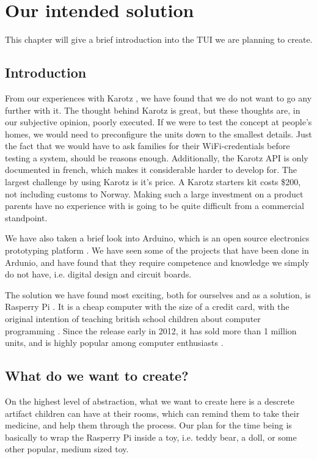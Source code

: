 
\chapter{Our intended solution}
\label{chp:our-solution}

This chapter will give a brief introduction into the TUI we are planning to create. 

\section{Introduction}
From our experiences with Karotz \cite{karotz}, we have found that we do not want to go any further with it. The thought behind Karotz is great, but these thoughts are, in our subjective opinion, poorly executed. If we were to test the concept at people's homes, we would need to preconfigure the units down to the smallest details. Just the fact that we would have to ask families for their WiFi-credentials before testing a system, should be reasons enough.
Additionally, the Karotz API is only documented in french, which makes it considerable harder to develop for. The largest challenge by using Karotz is it's price. A Karotz starters kit costs \$200, not including customs to Norway. Making such a large investment on a product parents have no experience with is going to be quite difficult from a commercial standpoint.  


We have also taken a brief look into Arduino, which is an open source electronics prototyping platform \cite{arduino}. We have seen some of the projects that have been done in Ardunio, and have found that they require competence and knowledge we simply do not have, i.e. digital design and circuit boards. 


The solution we have found most exciting, both for ourselves and as a solution, is Rasperry Pi \cite{rasperrypi}. It is a cheap computer with the size of a credit card, with the original intention of teaching british school children about computer programming \cite{rasperrypi-about}. Since the release early in 2012, it has sold more than 1 million units, and is highly popular among computer enthusiasts \cite{pimillion}. 


\section{What do we want to create?}
On the highest level of abstraction, what we want to create here is a descrete artifact children can have at their rooms, which can remind them to take their medicine, and help them through the process. Our plan for the time being is basically to wrap the Rasperry Pi inside a toy, i.e. teddy bear, a doll, or some other popular, medium sized toy.

